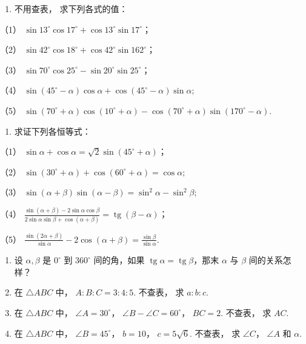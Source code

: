 \begin{enumerate}[start=5]
\item
  不用查表， 求下列各式的值：
\end{enumerate}

（1）
\(\sin 13^{\circ} \cos 17^{\circ} + \cos 13^{\circ} \sin 17^{\circ}\)；

（2）
\(\sin 42^{\circ} \cos 18^{\circ} + \cos 42^{\circ} \sin 162^{\circ}\)；

（3）
\(\sin 70^{\circ} \cos 25^{\circ} - \sin 20^{\circ} \sin 25^{\circ}\)；

（4）
\(\sin (45^{\circ} - \alpha)\cos \alpha +\cos (45^{\circ} - \alpha)\sin \alpha ;\)

（5）
\(\sin (70^{\circ} + \alpha)\cos (10^{\circ} + \alpha) - \cos (70^{\circ} + \alpha)\sin (170^{\circ} - \alpha)\).

\begin{enumerate}[start=6]
\item
  求证下列各恒等式：
\end{enumerate}

（1）
\(\sin \alpha + \cos \alpha = \sqrt{2} \sin (45^\circ + \alpha)\)；

（2）
\(\sin (30^{\circ} + \alpha) + \cos (60^{\circ} + \alpha) = \cos \alpha;\)

（3）
\(\sin (\alpha +\beta)\sin (\alpha -\beta) = \sin^2\alpha -\sin^2\beta ;\)

（4）
\(\frac{\sin(\alpha + \beta) - 2\sin\alpha\cos\beta}{2\sin\alpha\sin\beta + \cos(\alpha + \beta)} = \operatorname{tg}(\beta - \alpha)\)；

（5）
\(\frac{\sin(2\alpha + \beta)}{\sin\alpha} - 2\cos (\alpha + \beta) = \frac{\sin\beta}{\sin\alpha}\).

\begin{enumerate}[start=7]
\item
  设 \(\alpha, \beta\) 是 \(0^{\circ}\) 到 \(360^{\circ}\) 间的角，如果
  \(\operatorname{tg} \alpha = \operatorname{tg} \beta\)，那末
  \(\alpha\) 与 \(\beta\) 间的关系怎样？
\item
  在 \(\triangle ABC\) 中， \(A:B:C=3:4:5\). 不查表， 求 \(a:b:c\).
\item
  在 \(\triangle ABC\) 中， \(\angle A = 30^{\circ}\)，
  \(\angle B - \angle C = 60^{\circ}\)， \(BC = 2\). 不查表， 求 \(AC\).
\item
  在 \(\triangle ABC\) 中， \(\angle B = 45^{\circ}\)， \(b = 10\)，
  \(c = 5\sqrt{6}\). 不查表， 求 \(\angle C\)， \(\angle A\) 和
  \(\alpha\).
\end{enumerate}


